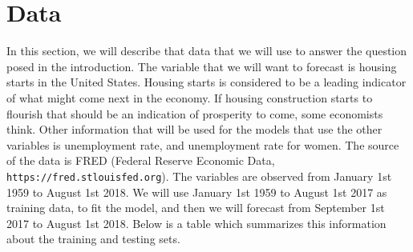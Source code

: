 \documentclass[11pt]{article}
\begin{document}
\section{Data}
In this section, we will describe that data that we will use to answer the question posed in the introduction. The
variable that we will want to forecast is housing starts in the United States. Housing starts is considered to be a leading indicator of what might come next in the economy. If housing construction starts to flourish that should be an indication of prosperity to come, some economists think. Other information that will be used for the models that use the other variables is unemployment rate, and unemployment rate for women. The source of the data is FRED (Federal Reserve Economic Data, 
{\tt https://fred.stlouisfed.org}). The variables are observed from January 1st 1959 to August 1st 2018. We will use January 1st 1959 to August 1st 2017 as training data, to fit the model, and then we will forecast from September 1st 2017 to August 1st 2018. Below is a table which summarizes this information about the training and testing sets. 
\end{document}
